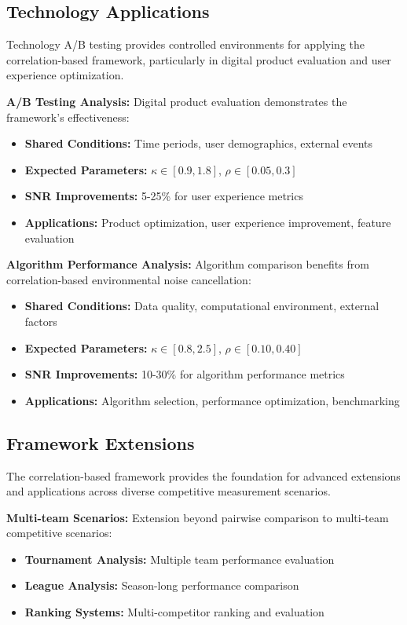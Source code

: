 \subsection{Technology Applications}

Technology A/B testing provides controlled environments for applying the correlation-based framework, particularly in digital product evaluation and user experience optimization.

\textbf{A/B Testing Analysis:}
Digital product evaluation demonstrates the framework's effectiveness:
\begin{itemize}
    \item \textbf{Shared Conditions:} Time periods, user demographics, external events
    \item \textbf{Expected Parameters:} $\kappa \in [0.9, 1.8]$, $\rho \in [0.05, 0.3]$
    \item \textbf{SNR Improvements:} 5-25\% for user experience metrics
    \item \textbf{Applications:} Product optimization, user experience improvement, feature evaluation
\end{itemize}

\textbf{Algorithm Performance Analysis:}
Algorithm comparison benefits from correlation-based environmental noise cancellation:
\begin{itemize}
    \item \textbf{Shared Conditions:} Data quality, computational environment, external factors
    \item \textbf{Expected Parameters:} $\kappa \in [0.8, 2.5]$, $\rho \in [0.10, 0.40]$
    \item \textbf{SNR Improvements:} 10-30\% for algorithm performance metrics
    \item \textbf{Applications:} Algorithm selection, performance optimization, benchmarking
\end{itemize}

\subsection{Framework Extensions}

The correlation-based framework provides the foundation for advanced extensions and applications across diverse competitive measurement scenarios.

\textbf{Multi-team Scenarios:}
Extension beyond pairwise comparison to multi-team competitive scenarios:
\begin{itemize}
    \item \textbf{Tournament Analysis:} Multiple team performance evaluation
    \item \textbf{League Analysis:} Season-long performance comparison
    \item \textbf{Ranking Systems:} Multi-competitor ranking and evaluation
\end{itemize}

